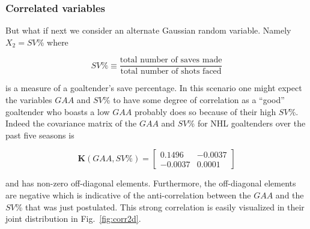 \subsubsection{Correlated variables}
But what if next we consider an alternate Gaussian random variable. Namely
$X_2 = SV$\% where

\begin{equation}
  SV\% \equiv \frac{\text{total number of saves made}}{\text{total number of shots faced}}
\end{equation}

\noindent is a measure of a goaltender's save percentage. In this scenario one
might expect the variables $GAA$ and $SV$\% to have some degree of correlation
as a ``good'' goaltender who boasts a low $GAA$ probably does so because of their
high $SV$\%. Indeed the covariance matrix of the $GAA$ and $SV$\% for NHL
goaltenders over the past five seasons is

\begin{equation}
  \mathbf{K}(GAA,SV\%) =
  \begin{bmatrix}
    0.1496 & -0.0037 \\
    -0.0037 & 0.0001
  \end{bmatrix}
  \label{eq:Kcorr}
\end{equation}

\noindent and has non-zero off-diagonal elements. Furthermore, the off-diagonal
elements are negative which is indicative of the anti-correlation between the
$GAA$ and the $SV$\% that was just postulated. This strong correlation
is easily visualized in their joint distribution in Fig.~\ref{fig:corr2d}. \\


